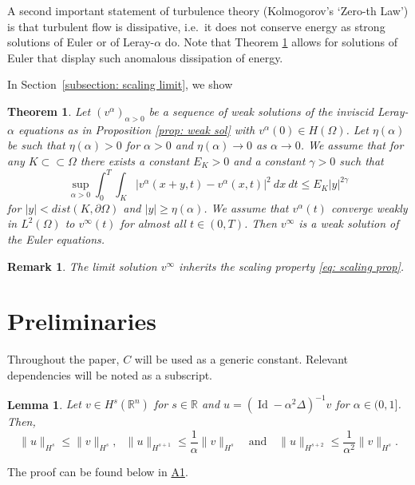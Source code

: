 \documentclass{amsart}
\newtheorem{theorem}{Theorem}
\newtheorem{lemma}{Lemma}
\newtheorem{remark}{Remark}
\begin{document}
A second important statement of turbulence theory (Kolmogorov's `Zero-th Law') is that turbulent flow is dissipative, i.e.\ it does not conserve energy as strong solutions of Euler or of Leray\mbox{-}$\alpha$ do. Note that Theorem \ref{thm: 2} allows for solutions of Euler that display such anomalous dissipation of energy.


In Section~\ref{subsection: scaling limit}, we show
\begin{theorem}
\label{thm: 2}
    Let $(v^{\alpha})_{\alpha>0}$ be a sequence of weak solutions of the inviscid Leray-$\alpha$ equations as in Proposition \ref{prop: weak sol}
with $ v^{\alpha}(0) \in H(\Omega)$. Let  $\eta(\alpha)$ be such that $\eta(\alpha)>0$ for $\alpha>0$ and $\eta(\alpha)\to0$ as $\alpha \to 0$. We assume that for any $K\subset \subset \Omega$ there exists a constant $E_K>0$ and a constant $\gamma>0$ such that
\begin{equation}
\label{eq: scaling prop}
    \underset{\alpha > 0}{\operatorname{sup}} \int_0^T \int_K |v^{\alpha}(x+y,t)-v^{\alpha}(x,t)|^2 \ dx \ dt \leq E_K |y|^{2\gamma}
\end{equation}
for $|y|< dist(K,\partial \Omega)$ and 
$|y| \geq \eta(\alpha)$. We assume that $v^{\alpha}(t)$ converge weakly in $L^2(\Omega)$ to $v^{\infty}(t)$ for almost all $t\in (0,T)$. Then $v^{\infty}$ is a weak solution of the Euler equations.
\end{theorem}
\begin{remark}
The limit solution $v^{\infty}$ inherits the scaling property \eqref{eq: scaling prop}.
\end{remark}

\section{Preliminaries}
Throughout the paper, $C$ will be used as a generic constant. Relevant dependencies will be noted as a subscript.

 \begin{lemma}
 \label{lemma: relation norms}
Let $v\in H^s(\mathbb{R}^n)$ for $s\in \mathbb{R}$ and $u=(\operatorname{Id}-\alpha^2\Delta)^{-1}v$ for $\alpha\in(0,1]$. Then,
$$ \|u\|_{H^s} \leq \|v\|_{H^s}, \ \ \ \|u\|_{H^{s+1}} \leq \frac{1}{\alpha} \|v\|_{H^s} \ \ \ \text{ and } \ \ \ \|u\|_{H^{s+2}} \leq \frac{1}{\alpha^2} \|v\|_{H^s}.$$
\end{lemma}
The proof can be found below in \hyperref[subsection: relation between norms]{A1}.
\end{document}
